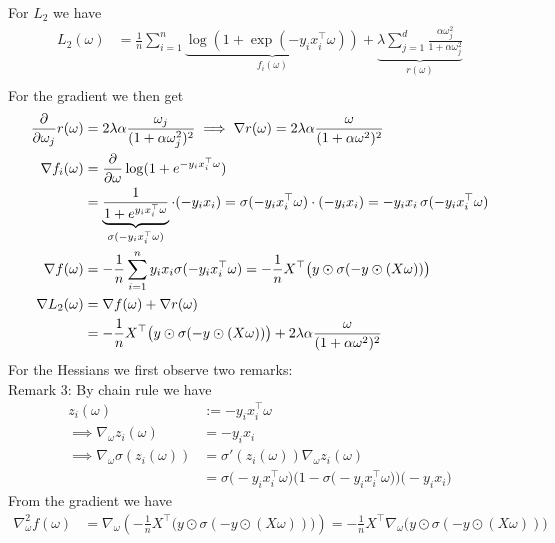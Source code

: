 \documentclass{article}
\begin{document}
For $L_2$ we have
\begin{align*}
L_2(\omega) &= \frac{1}{n} \sum_{i=1}^n \underbrace{\log \left(1 + \exp(-y_i x_i^\top \omega)\right) }_{f_i(\omega)} + \underbrace{\lambda \sum_{j=1}^d \frac{\alpha \omega_j^2}{1 + \alpha \omega_j^2}}_{r(\omega)} \\
\end{align*}
For the gradient we then get
\begin{align*}
\frac{\partial}{\partial \omega_j} r(\omega) &= 2 \lambda \alpha \frac{\omega_j}{(1 + \alpha \omega_j^2)^2}
 \implies \nabla r(\omega) = 2 \lambda \alpha \frac{\omega}{(1 + \alpha \omega^2)^2} \\
%
\nabla f_i(\omega) &= \frac{\partial}{\partial \omega} \log(1 + e^{-y_i x_i^\top \omega}) \notag \\
&= \underbrace{\frac{1}{1 + e^{y_i x_i^\top \omega}}}_{\sigma(-y_i x_i^\top \omega)} \cdot (-y_i x_i) = \sigma(-y_i x_i^\top \omega) \cdot (-y_i x_i) = -y_i x_i \, \sigma(-y_i x_i^\top \omega) \notag\\
%
\nabla f(\omega) &= -\frac{1}{n} \sum_{i=1}^n y_i x_i \sigma(-y_i x_i^\top \omega) = -\frac{1}{n} X^\top \big(y \odot \sigma(-y \odot (X \omega))\big) \\
\nabla L_2(\omega) &= \nabla f(\omega) + \nabla r(\omega) \notag \\
 &= -\frac{1}{n} X^\top \big(y \odot \sigma(-y \odot (X \omega))\big) + 2 \lambda \alpha \frac{\omega}{(1 + \alpha \omega^2)^2}
\end{align*}
For the Hessians we first observe two remarks:\\
Remark 3: By chain rule we have
\begin{align*}
z_i(\omega) &:= -y_i x_i^\top \omega \\
\implies \nabla_\omega z_i(\omega) &= -y_i x_i \\
\implies \nabla_\omega \sigma(z_i(\omega)) 
&= \sigma'(z_i(\omega)) \nabla_\omega z_i(\omega) \\
&= \sigma\bigl(-y_i x_i^\top \omega\bigr)\bigl(1 - \sigma\bigl(-y_i x_i^\top \omega\bigr)\bigr)\bigl(-y_i x_i\bigr)
\end{align*}
%
From the gradient we have
\begin{align*}
\nabla^2_\omega f(\omega) 
&= \nabla_\omega \left( -\frac{1}{n} X^\top \big(y \odot \sigma(-y \odot (X\omega))\big) \right) = -\frac{1}{n} X^\top \nabla_\omega \big(y \odot \sigma(-y \odot (X\omega))\big) \\
%
\end{align*}
\end{document}
